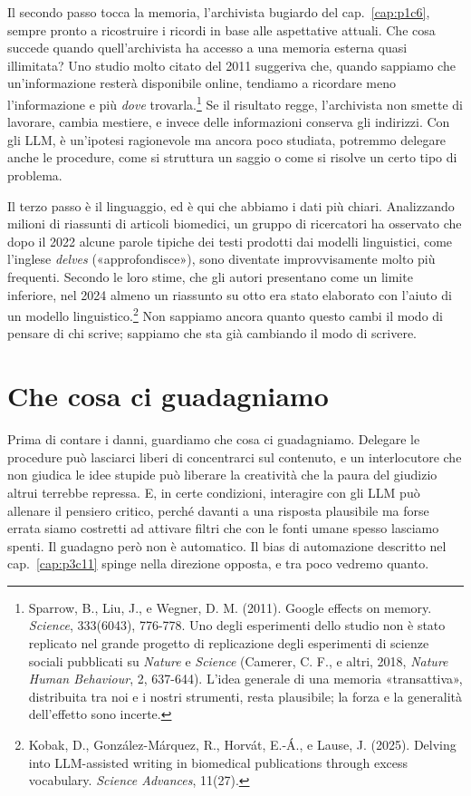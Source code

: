 Il secondo passo tocca la memoria, l'archivista bugiardo del cap.~\ref{cap:p1c6}, sempre pronto a ricostruire i ricordi in base alle aspettative attuali. Che cosa succede quando quell'archivista ha accesso a una memoria esterna quasi illimitata? Uno studio molto citato del 2011 suggeriva che, quando sappiamo che un'informazione resterà disponibile online, tendiamo a ricordare meno l'informazione e più \textit{dove} trovarla.\footnote{Sparrow, B., Liu, J., e Wegner, D. M. (2011). Google effects on memory. \textit{Science}, 333(6043), 776-778. Uno degli esperimenti dello studio non è stato replicato nel grande progetto di replicazione degli esperimenti di scienze sociali pubblicati su \textit{Nature} e \textit{Science} (Camerer, C. F., e altri, 2018, \textit{Nature Human Behaviour}, 2, 637-644). L'idea generale di una memoria «transattiva», distribuita tra noi e i nostri strumenti, resta plausibile; la forza e la generalità dell'effetto sono incerte.} Se il risultato regge, l'archivista non smette di lavorare, cambia mestiere, e invece delle informazioni conserva gli indirizzi. Con gli LLM, è un'ipotesi ragionevole ma ancora poco studiata, potremmo delegare anche le procedure, come si struttura un saggio o come si risolve un certo tipo di problema.

Il terzo passo è il linguaggio, ed è qui che abbiamo i dati più chiari. Analizzando milioni di riassunti di articoli biomedici, un gruppo di ricercatori ha osservato che dopo il 2022 alcune parole tipiche dei testi prodotti dai modelli linguistici, come l'inglese \textit{delves} («approfondisce»), sono diventate improvvisamente molto più frequenti. Secondo le loro stime, che gli autori presentano come un limite inferiore, nel 2024 almeno un riassunto su otto era stato elaborato con l'aiuto di un modello linguistico.\footnote{Kobak, D., González-Márquez, R., Horvát, E.-Á., e Lause, J. (2025). Delving into LLM-assisted writing in biomedical publications through excess vocabulary. \textit{Science Advances}, 11(27).} Non sappiamo ancora quanto questo cambi il modo di pensare di chi scrive; sappiamo che sta già cambiando il modo di scrivere.

\section{Che cosa ci guadagniamo}

Prima di contare i danni, guardiamo che cosa ci guadagniamo. Delegare le procedure può lasciarci liberi di concentrarci sul contenuto, e un interlocutore che non giudica le idee stupide può liberare la creatività che la paura del giudizio altrui terrebbe repressa. E, in certe condizioni, interagire con gli LLM può allenare il pensiero critico, perché davanti a una risposta plausibile ma forse errata siamo costretti ad attivare filtri che con le fonti umane spesso lasciamo spenti. Il guadagno però non è automatico. Il bias di automazione descritto nel cap.~\ref{cap:p3c11} spinge nella direzione opposta, e tra poco vedremo quanto.

